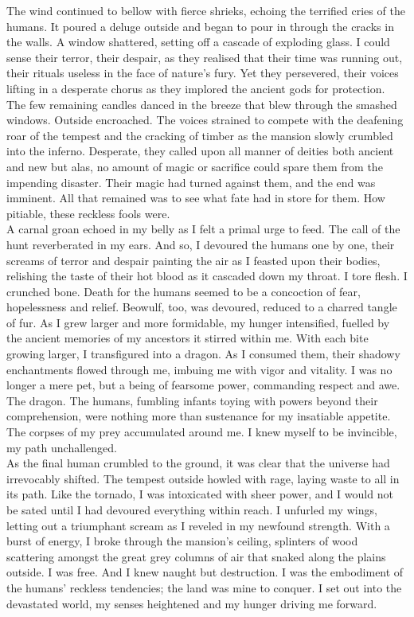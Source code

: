 The wind continued to bellow with fierce shrieks, echoing the terrified cries of the humans. It poured a deluge outside and began to pour in through the cracks in the walls. A window shattered, setting off a cascade of exploding glass. I could sense their terror, their despair, as they realised that their time was running out, their rituals useless in the face of nature's fury. Yet they persevered, their voices lifting in a desperate chorus as they implored the ancient gods for protection. The few remaining candles danced in the breeze that blew through the smashed windows. Outside encroached. The voices strained to compete with the deafening roar of the tempest and the cracking of timber as the mansion slowly crumbled into the inferno. Desperate, they called upon all manner of deities both ancient and new but alas, no amount of magic or sacrifice could spare them from the impending disaster. Their magic had turned against them, and the end was imminent. All that remained was to see what fate had in store for them. How pitiable, these reckless fools were. \\

A carnal groan echoed in my belly as I felt a primal urge to feed. The call of the hunt reverberated in my ears. And so, I devoured the humans one by one, their screams of terror and despair painting the air as I feasted upon their bodies, relishing the taste of their hot blood as it cascaded down my throat. I tore flesh. I crunched bone. Death for the humans seemed to be a concoction of fear, hopelessness and relief. Beowulf, too, was devoured, reduced to a charred tangle of fur. As I grew larger and more formidable, my hunger intensified, fuelled by the ancient memories of my ancestors it stirred within me. With each bite growing larger, I transfigured into a dragon. As I consumed them, their shadowy enchantments flowed through me, imbuing me with vigor and vitality. I was no longer a mere pet, but a being of fearsome power, commanding respect and awe. The dragon. The humans, fumbling infants toying with powers beyond their comprehension, were nothing more than sustenance for my insatiable appetite. The corpses of my prey accumulated around me. I knew myself to be invincible, my path unchallenged. \\

As the final human crumbled to the ground, it was clear that the universe had irrevocably shifted. The tempest outside howled with rage, laying waste to all in its path. Like the tornado, I was intoxicated with sheer power, and I would not be sated until I had devoured everything within reach. I unfurled my wings, letting out a triumphant scream as I reveled in my newfound strength. With a burst of energy, I broke through the mansion's ceiling, splinters of wood scattering amongst the great grey columns of air that snaked along the plains outside. I was free. And I knew naught but destruction. I was the embodiment of the humans' reckless tendencies; the land was mine to conquer. I set out into the devastated world, my senses heightened and my hunger driving me forward. \\

